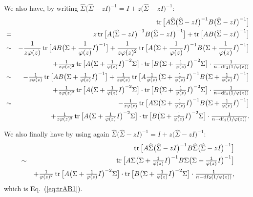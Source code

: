 \documentclass[11pt]{article}
\newcommand{\BEAS}{\begin{eqnarray*}}
\newcommand{\EEAS}{\end{eqnarray*}}
\newcommand{\tr}{\mathop{ \rm tr}}
\newcommand{\idm}{I}
\newcommand{\eq}[1]{Eq.~(\ref{eq:#1})}
\def \hS{ \widehat{ \Sigma} }
\def \S{  { \Sigma} }
\begin{document}
We also have, by writing  $ \hS\big( \hS -  z\idm \big)^{-1} = \idm +  z  \big( \hS -  z\idm \big)^{-1}$:
  \BEAS
 & &  \tr \big[ A  \hS\big( \hS -  z\idm \big)^{-1}  B  \big( \hS -  z\idm \big)^{-1}  \big]  \\
 &= & \textstyle z \tr \big[ A  \big( \hS -  z\idm \big)^{-1}  B  \big( \hS -  z\idm \big)^{-1}  \big] 
 +\tr \big[ A   B  \big( \hS -  z\idm \big)^{-1}  \big] \\
& \sim & - \frac{1}{z \varphi(z)}   \tr \big[ A   B  \big( \S  + \frac{1}{\varphi(z)} \idm \big)^{-1}  \big] +  \frac{1}{z  \varphi(z)^2}  \tr \big[ A   \big( \S + \frac{1}{\varphi(z)} \idm \big)^{-1}    B   \big( \S + \frac{1}{\varphi(z)} \idm \big)^{-1}    \big] 
 \\
 & & \textstyle+ \frac{1}{z \varphi(z)^2}   \tr \big[
    A    \big( \S + \frac{1}{\varphi(z)} \idm \big)^{-2}  \Sigma \big]
     \cdot 
     \tr \big[
    B    \big( \S + \frac{1}{\varphi(z)} \idm \big)^{-2}  \Sigma \big]
    \cdot   \frac{1}{ n -  {\rm df}_2(1/\varphi(z))  }
\\
 & \sim &\textstyle - \frac{1}{z \varphi(z)}   \tr \big[ A   B  \big( \S  + \frac{1}{\varphi(z)} \idm \big)^{-1}  \big] +  \frac{1}{z  \varphi(z)}  \tr \big[ A   \frac{1}{\varphi(z)}\big( \S + \frac{1}{\varphi(z)} \idm \big)^{-1}    B   \big( \S + \frac{1}{\varphi(z)} \idm \big)^{-1}    \big] 
 \\
 & & \textstyle+ \frac{1}{z \varphi(z)^2}   \tr \big[
    A    \big( \S + \frac{1}{\varphi(z)} \idm \big)^{-2}  \Sigma \big]
     \cdot 
     \tr \big[
    B    \big( \S + \frac{1}{\varphi(z)} \idm \big)^{-2}  \Sigma \big]
    \cdot   \frac{1}{ n -  {\rm df}_2(1/\varphi(z))  }
\\
 & \sim &\textstyle - \frac{1}{z \varphi(z)}   \tr \big[ A   \S  \big( \S  + \frac{1}{\varphi(z)} \idm \big)^{-1} B  \big( \S  + \frac{1}{\varphi(z)} \idm \big)^{-1}  \big]  
 \\
 & & \textstyle+ \frac{1}{z \varphi(z)^2}   \tr \big[
    A    \big( \S + \frac{1}{\varphi(z)} \idm \big)^{-2}  \Sigma \big]
     \cdot 
     \tr \big[
    B    \big( \S + \frac{1}{\varphi(z)} \idm \big)^{-2}  \Sigma \big]
    \cdot   \frac{1}{ n -  {\rm df}_2(1/\varphi(z))  }.
\EEAS

We also finally have by using again $ \hS\big( \hS -  z\idm \big)^{-1} = \idm +  z  \big( \hS -  z\idm \big)^{-1}$:
  \BEAS
 & &  \tr \big[ A  \hS\big( \hS -  z\idm \big)^{-1}  B \hS\big( \hS -  z\idm \big)^{-1} \big]  \\
& \sim & \textstyle  \tr \big[ A   \S  \big( \S  + \frac{1}{\varphi(z)} \idm \big)^{-1} B  \S\big( \S  + \frac{1}{\varphi(z)} \idm \big)^{-1}  \big]  
 \\
 & &\textstyle + \frac{1}{ \varphi(z)^2}   \tr \big[
    A    \big( \S + \frac{1}{\varphi(z)} \idm \big)^{-2}  \Sigma \big]
     \cdot 
     \tr \big[
    B    \big( \S + \frac{1}{\varphi(z)} \idm \big)^{-2}  \Sigma \big]
    \cdot   \frac{1}{ n -  {\rm df}_2(1/\varphi(z))  },
\EEAS
which is \eq{trAB1}.



     
 
 
 
\end{document}

